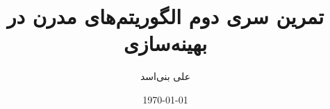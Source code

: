 \documentclass[12pt,onecolumn,a4paper]{article}
\begin{document}
	\title{تمرین سری دوم الگوریتم‌های مدرن در بهینه‌سازی} 
	\author{علی بنی‌اسد}
	\date{\today}
	\maketitle
	
	
	
	
	
\end{document}
